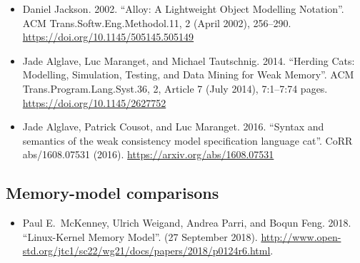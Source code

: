 \begin{itemize}
\item	Daniel Jackson. 2002. ``Alloy: A Lightweight Object Modelling
	Notation''. ACM Trans.\@ Softw.\@ Eng.\@ Methodol.\@ 11, 2 (April 2002),
	256--290. \url{https://doi.org/10.1145/505145.505149}

\item	Jade Alglave, Luc Maranget, and Michael Tautschnig. 2014. ``Herding
	Cats: Modelling, Simulation, Testing, and Data Mining for Weak
	Memory''. ACM Trans.\@ Program.\@ Lang.\@ Syst.\@ 36, 2, Article 7 (July
	2014), 7:1--7:74 pages. \url{https://doi.org/10.1145/2627752}

\item	Jade Alglave, Patrick Cousot, and Luc Maranget. 2016. ``Syntax and
	semantics of the weak consistency model specification language
	cat''. CoRR abs/1608.07531 (2016). \url{https://arxiv.org/abs/1608.07531}
\end{itemize}

\subsection{Memory-model comparisons}

\begin{itemize}
\item	Paul E.~McKenney, Ulrich Weigand, Andrea Parri, and Boqun
	Feng. 2018. ``Linux-Kernel Memory Model''. (27 September 2018).
	\url{http://www.open-std.org/jtc1/sc22/wg21/docs/papers/2018/p0124r6.html}.
\end{itemize}
